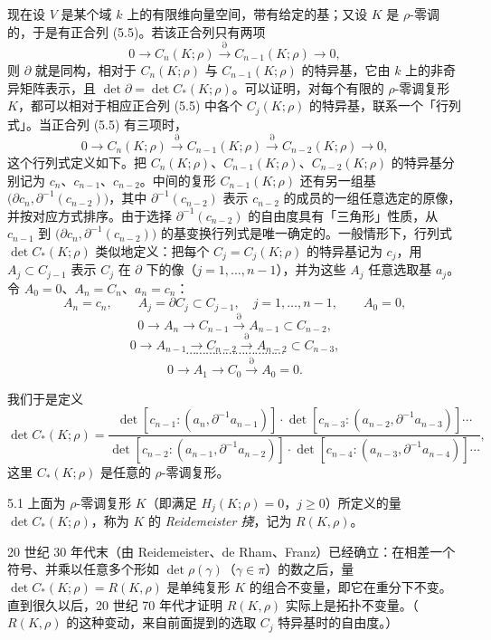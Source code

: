 现在设 $V$ 是某个域 $k$ 上的有限维向量空间，带有给定的基；又设 $K$ 是 $\rho$-零调的，于是有正合列 (5.5)。若该正合列只有两项
\[
  0\longrightarrow C_n(K;\rho)\xrightarrow{\partial}C_{n-1}(K;\rho)\longrightarrow 0,
\]
则 $\partial$ 就是同构，相对于 $C_n(K;\rho)$ 与 $C_{n-1}(K;\rho)$ 的特异基，它由 $k$ 上的非奇异矩阵表示，且 $\det\partial=\det C_*(K;\rho)$。可以证明，对每个有限的 $\rho$-零调复形 $K$，都可以相对于相应正合列 (5.5) 中各个 $C_j(K;\rho)$ 的特异基，联系一个「行列式」。当正合列 (5.5) 有三项时，
\[
  0\longrightarrow C_n(K;\rho)\xrightarrow{\partial}C_{n-1}(K;\rho)\xrightarrow{\partial}C_{n-2}(K;\rho)\longrightarrow 0,
\]
这个行列式定义如下。把 $C_n(K;\rho)$、$C_{n-1}(K;\rho)$、$C_{n-2}(K;\rho)$ 的特异基分别记为 $c_n$、$c_{n-1}$、$c_{n-2}$。中间的复形 $C_{n-1}(K;\rho)$ 还有另一组基 $\bigl(\partial c_n,\partial^{-1}(c_{n-2})\bigr)$，其中 $\partial^{-1}(c_{n-2})$ 表示 $c_{n-2}$ 的成员的一组任意选定的原像，并按对应方式排序。由于选择 $\partial^{-1}(c_{n-2})$ 的自由度具有「三角形」性质，从 $c_{n-1}$ 到 $\bigl(\partial c_n,\partial^{-1}(c_{n-2})\bigr)$ 的基变换行列式是唯一确定的。一般情形下，行列式 $\det C_*(K;\rho)$ 类似地定义：把每个 $C_j=C_j(K;\rho)$ 的特异基记为 $c_j$，用 $A_j\subset C_{j-1}$ 表示 $C_j$ 在 $\partial$ 下的像（$j=1,\dots,n-1$），并为这些 $A_j$ 任意选取基 $a_j$。令 $A_0=0$、$A_n=C_n$、$a_n=c_n$：
\[
  A_n=c_n,\qquad A_j=\partial C_j\subset C_{j-1},\quad j=1,\dots,n-1,\qquad A_0=0,
\]
\[
  0\longrightarrow A_n\longrightarrow C_{n-1}\xrightarrow{\partial}A_{n-1}\subset C_{n-2},
\]
\[
  0\longrightarrow A_{n-1}\longrightarrow C_{n-2}\xrightarrow{\partial}A_{n-2}\subset C_{n-3},
\]
\[
  \cdots\cdots\cdots\cdots\cdots\cdots\cdots\cdots\cdots\cdots
\]
\[
  0\longrightarrow A_1\longrightarrow C_0\xrightarrow{\partial}A_0=0.
\]

我们于是定义
\[
  \det C_*(K;\rho)=
  \frac{\det[c_{n-1}:(a_n,\partial^{-1}a_{n-1})]\cdot\det[c_{n-3}:(a_{n-2},\partial^{-1}a_{n-3})]\cdots}
       {\det[c_{n-2}:(a_{n-1},\partial^{-1}a_{n-2})]\cdot\det[c_{n-4}:(a_{n-3},\partial^{-1}a_{n-4})]\cdots},
\]
这里 $C_*(K;\rho)$ 是任意的 $\rho$-零调复形。

\begin{definition*}{5.1}
上面为 $\rho$-零调复形 $K$（即满足 $H_j(K;\rho)=0$，$j\ge0$）所定义的量 $\det C_*(K;\rho)$，称为 $K$ 的 \emph{Reidemeister 挠}，记为 $R(K,\rho)$。
\end{definition*}

20 世纪 30 年代末（由 Reidemeister、de Rham、Franz）已经确立：在相差一个符号、并乘以任意多个形如 $\det\rho(\gamma)$（$\gamma\in\pi$）的数之后，量 $\det C_*(K;\rho)=R(K,\rho)$ 是单纯复形 $K$ 的组合不变量，即它在重分下不变。直到很久以后，20 世纪 70 年代才证明 $R(K,\rho)$ 实际上是拓扑不变量。（$R(K,\rho)$ 的这种变动，来自前面提到的选取 $C_j$ 特异基时的自由度。）

